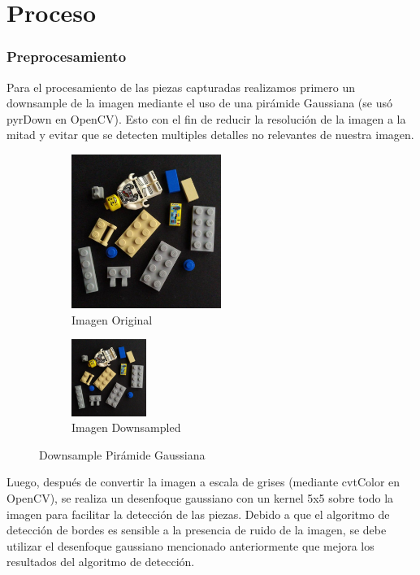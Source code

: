 \documentclass[letterpaper]{scrreprt}
\begin{document}

\chapter{Proceso}

\subsection{Preprocesamiento}
Para el procesamiento de las piezas capturadas realizamos primero un downsample de la imagen mediante el uso de una pirámide Gaussiana (se usó pyrDown en OpenCV). Esto con el fin de reducir la resolución de la imagen a la mitad y evitar que se detecten multiples detalles no relevantes de nuestra imagen.

\begin{figure}[H]
	\begin{subfigure}{0.5\textwidth}
		\includegraphics[width=0.8\linewidth, height=5cm]{Process/fifthStage5.jpeg} 
		\caption{Imagen Original}
		\label{fig:subim10}
	\end{subfigure}
	\begin{subfigure}{0.5\textwidth}
		\centering
		\includegraphics[width=0.4\linewidth, height=2.5cm]{Process/fifthStage5_pyrDown.png} 
		\caption{Imagen Downsampled}
		\label{fig:subim11}
	\end{subfigure}
	\caption{Downsample Pirámide Gaussiana}
	\label{fig:image3}
\end{figure}

Luego, después de convertir la imagen a escala de grises (mediante cvtColor en OpenCV), se realiza un desenfoque gaussiano con un kernel 5x5 sobre todo la imagen para facilitar la detección de las piezas. Debido a que el algoritmo de detección de bordes es sensible a la presencia de ruido de la imagen, se debe utilizar el desenfoque gaussiano mencionado anteriormente que mejora los resultados del algoritmo de detección.
\end{document}
